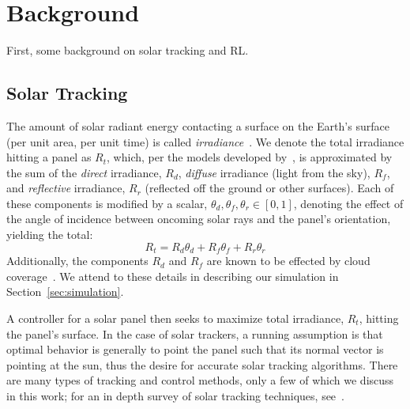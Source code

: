 \documentclass{article}
\begin{document}
\section{Background}

First, some background on solar tracking and RL.

\subsection{Solar Tracking}
The amount of solar radiant energy contacting a surface on the Earth's surface (per unit area, per unit time) is called {\it irradiance}~\cite{goswami2000principles}.  We denote the total irradiance hitting a panel as $R_t$, which, per the models developed by~\citet{kamali2006estimating}, is approximated by the sum of the {\it direct} irradiance, $R_d$, {\it diffuse} irradiance (light from the sky), $R_f$, and {\it reflective} irradiance, $R_r$ (reflected off the ground or other surfaces). Each of these components is modified by a scalar, $\theta_d, \theta_f, \theta_r \in [0,1]$, denoting the effect of the angle of incidence between oncoming solar rays and the panel's orientation, yielding the total:
\begin{equation}
R_t = R_d \theta_d + R_f \theta_f + R_r \theta_r
\label{eq:total_rads}
\end{equation}
Additionally, the components $R_d$ and $R_f$ are known to be effected by cloud coverage~\cite{li2004overcast,pfister2003cloud,tzoumanikas2016effect}. We attend to these details in describing our simulation in Section~\ref{sec:simulation}.

A controller for a solar panel then seeks to maximize total irradiance, $R_t$, hitting the panel's surface. In the case of solar trackers, a running assumption is that optimal behavior is generally to point the panel such that its normal vector is pointing at the sun, thus the desire for accurate solar tracking algorithms. There are many types of tracking and control methods, only a few of which we discuss in this work; for an in depth survey of solar tracking techniques, see~\citet{mousazadeh2009review}.
\end{document}
